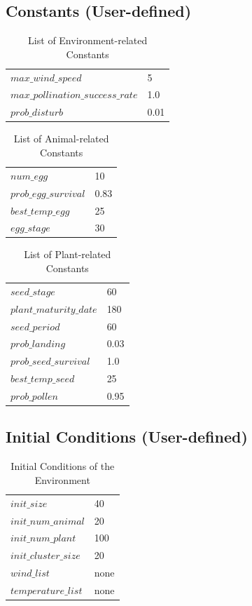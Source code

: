 \documentclass[3p,,preprint,12pt]{elsarticle}
\begin{document}
\subsection{\textbf{Constants (User-defined)}}
\begin{table}[!htb]
\begin{tabular}{ l l }
 $max\_wind\_speed$ & 5 \\
 $max\_pollination\_success\_rate$ & 1.0 \\
 $prob\_disturb$ & 0.01 \\
\end{tabular}
\caption{\label{tab:table-name}List of Environment-related Constants}
\end{table}

\begin{table}[!htb]
\begin{tabular}{ l l }
 $num\_egg$ & 10 \\ 
 $prob\_egg\_survival$ & 0.83 \\
 $best\_temp\_egg$ & 25 \\
 $egg\_stage$ & 30 \\ 
\end{tabular}
\caption{\label{tab:table-name}List of Animal-related Constants}
\end{table}

\begin{table}[!htb]
\begin{tabular}{ l l }
 $seed\_stage$ & 60 \\ 
 $plant\_maturity\_date$ & 180 \\
 $seed\_period$ & 60 \\
 $prob\_landing$ & 0.03 \\ 
 $prob\_seed\_survival$ & 1.0 \\
 $best\_temp\_seed$ & 25 \\
 $prob\_pollen$ & 0.95 \\
\end{tabular}
\caption{\label{tab:table-name}List of Plant-related Constants}
\end{table}

\subsection{\textbf{Initial Conditions (User-defined)}}
\begin{table}[!htb]
\begin{tabular}{ l l }
 $init\_size$ & 40\\
 $init\_num\_animal$ & 20\\ 
 $init\_num\_plant$ & 100\\
 $init\_cluster\_size$ & 20 \\
 $wind\_list$ & none \\
 $temperature\_list$ & none \\
\end{tabular}
\caption{\label{tab:table-name}Initial Conditions of the Environment}
\end{table}
\end{document}
